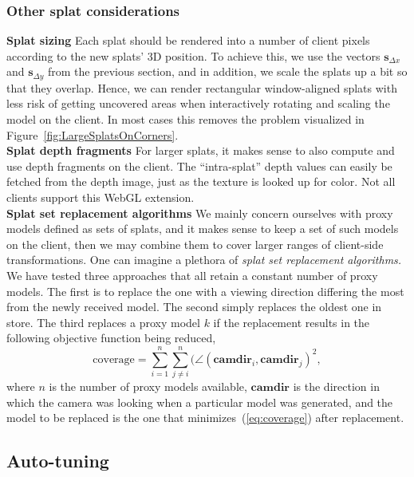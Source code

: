 \documentclass[10pt,conference,compsocconf]{IEEEtran}
\newcommand{\sv}{\mathbf{s}}
\begin{document}
\subsubsection{Other splat considerations}
\label{sec:proxyModelReplacement}

\textbf{Splat sizing} 
Each splat should be rendered into a number of client pixels according to the
new splats' 3D position. To achieve this, we use the vectors $\sv_{\Delta x}$
and $\sv_{\Delta y}$ from the previous section, and in addition, we scale the
splats up a bit so that they overlap. Hence, we can render rectangular
window-aligned splats with less risk of getting uncovered areas when
interactively rotating and scaling the model on the client. In most cases this
removes the problem visualized in Figure~\ref{fig:LargeSplatsOnCorners}.
\\
\textbf{Splat depth fragments}
For larger splats, it makes sense to also compute and use depth fragments on the
client. The ``intra-splat'' depth values can easily be fetched from the depth
image, just as the texture is looked up for color. Not all clients support this
WebGL extension.
\\
\textbf{Splat set replacement algorithms}
We mainly concern ourselves with proxy models defined as sets of splats, and it
makes sense to keep a set of such models on the client, then we may combine them
to cover larger ranges of client-side transformations. One can imagine a plethora of
{\em splat set replacement algorithms.} We have tested three approaches that all
retain a constant number of proxy models. The first is to replace the
one with a viewing direction differing the most from the newly received
model. The second simply replaces the oldest one in store. The third replaces a
proxy model $k$ if the replacement results in the following objective function
being reduced,
\begin{equation}
  \text{coverage} =
  \sum_{i=1}^n
    \sum_{j\neq i}^n 
      ( \angle(\textbf{camdir}_i, \textbf{camdir}_j )^2,
  \label{eq:coverage}
\end{equation}
where $n$ is the number of proxy models available, $\textbf{camdir}$ is the
direction in which the camera was looking when a particular model was generated,
and the model to be replaced is the one that minimizes~(\ref{eq:coverage}) after
replacement.


\subsection{Auto-tuning}
\label{sec:autoTuning}
\end{document}
